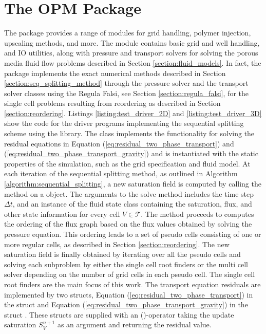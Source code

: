 \section{The OPM Package}
\label{section:opm_package}
The \opm package provides a range of modules for grid handling, polymer injection, upscaling methods, and more. The  module contains basic grid and well handling, and IO utilities, along with pressure and transport solvers for solving the porous media fluid flow problems described in Section \ref{section:fluid_models}. In fact, the \opm package implements the exact numerical methods described in Section \ref{section:seq_splitting_method} through the  pressure solver and the  transport solver classes using the Regula Falsi, see Section \ref{section:regula_falsi}, for the single cell problems resulting from  reordering as described in Section \ref{section:reordering}. Listings \ref{listing:test_driver_2D} and \ref{listing:test_driver_3D} show the code for the driver programs implementing the sequential splitting scheme using the \opm library. The class  implements the functionality for solving the residual equations in Equation (\ref{eq:residual_two_phase_transport}) and (\ref{eq:residual_two_phase_transport_gravity}) and is instantiated with the static properties of the simulation, such as the grid specification and fluid model. At each iteration of the sequential splitting method, as outlined in Algorithm \ref{algorithm:sequential_splitting}, a new saturation field is computed by calling the method  on a  object. The arguments to the solve method includes the time step $\Delta t$, and an instance of the fluid state class  containing the saturation, flux, and other state information for every cell $V \in \mathcal{T}$. The  method proceeds to computes the ordering of the flux graph based on the flux values obtained by solving the pressure equation. This ordering leads to a set of pseudo cells consisting of one or more regular cells, as described in Section \ref{section:reordering}. The new saturation field is finally obtained by iterating over all the pseudo cells and solving each subproblem by either the single cell root finders or the multi cell solver depending on the number of grid cells in each pseudo cell. The single cell root finders are the main focus of this work. The transport equation residuals are implemented by two structs, Equation (\ref{eq:residual_two_phase_transport}) in the struct  and Equation (\ref{eq:residual_two_phase_transport_gravity}) in the struct . These structs are supplied with an ()-operator taking the update saturation $S_V^{n+1}$ as an argument and returning the residual value.


